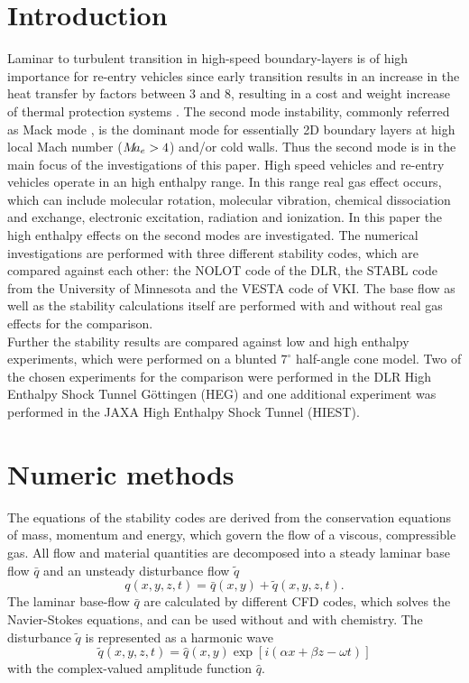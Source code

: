 \documentclass[]{aiaa-tc}%
\begin{document}
\section{Introduction}

Laminar to turbulent transition in high-speed boundary-layers is of high importance for re-entry vehicles since early transition results in an increase in the heat transfer by factors between 3 and 8, resulting in a cost and weight increase of thermal protection systems \cite{Schneider_1999,Schneider_2004}. The second mode instability, commonly referred as Mack mode \cite{Mack_1984}, is the dominant mode for essentially 2D boundary layers at high local Mach number ($M\hspace{-0.08cm} a_e > 4$) and/or cold walls\cite{Mack_1984}. Thus the second mode is in the main focus of the investigations of this paper. High speed vehicles and re-entry vehicles operate in an high enthalpy range. In this range real gas effect occurs, which can include molecular rotation, molecular vibration, chemical dissociation and exchange, electronic excitation, radiation and ionization. In this paper the high enthalpy effects on the second modes are investigated. The numerical investigations are performed with three different stability codes, which are compared against each other: the NOLOT code of the DLR, the STABL code from the University of Minnesota and the VESTA code of VKI. The base flow as well as the stability calculations itself are performed with and without real gas effects for the comparison.\\

Further the stability results are compared against low and high enthalpy experiments, which were performed on a blunted $7^\circ$ half-angle cone model. Two of the chosen experiments for the comparison were performed in the DLR High Enthalpy Shock Tunnel G\"ottingen (HEG) and one additional experiment was performed in the JAXA High Enthalpy Shock Tunnel (HIEST).


\section{Numeric methods}
The equations of the stability codes are derived from the conservation equations of mass, momentum and energy, which govern the flow of a viscous, compressible gas. All flow and material quantities are decomposed into a steady laminar base flow $\bar{q}$ and an unsteady 
disturbance flow $\tilde{q}$\
\begin{equation}
q(x,y,z,t)=\bar{q}(x,y)+\tilde{q}(x,y,z,t).
\end{equation}
The  laminar base-flow $\bar{q}$ are calculated by different CFD codes, which solves the Navier-Stokes equations, and can be used without and with chemistry. The disturbance $\tilde{q}$ is represented as a harmonic wave
\begin{equation}
\tilde{q}(x,y,z,t)=\hat{q}(x,y)\exp[i(\alpha x + \beta z - \omega t)]\label{wave}
\end{equation}
with the complex-valued amplitude function $\hat{q}$. \\
\end{document}
